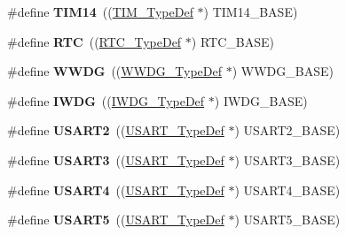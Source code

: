 \begin{DoxyCompactItemize}
\#define {\bfseries T\+I\+M14}~((\hyperlink{struct_t_i_m___type_def}{T\+I\+M\+\_\+\+Type\+Def} $\ast$) T\+I\+M14\+\_\+\+B\+A\+SE)
\item 
\mbox{\label{group___peripheral__declaration_ga5359a088f5d8b20ce74d920e46059304}} 
\#define {\bfseries R\+TC}~((\hyperlink{struct_r_t_c___type_def}{R\+T\+C\+\_\+\+Type\+Def} $\ast$) R\+T\+C\+\_\+\+B\+A\+SE)
\item 
\mbox{\label{group___peripheral__declaration_ga9821fd01757986612ddb8982e2fe27f1}} 
\#define {\bfseries W\+W\+DG}~((\hyperlink{struct_w_w_d_g___type_def}{W\+W\+D\+G\+\_\+\+Type\+Def} $\ast$) W\+W\+D\+G\+\_\+\+B\+A\+SE)
\item 
\mbox{\label{group___peripheral__declaration_gad16b79dd94ee85d261d08a8ee94187e7}} 
\#define {\bfseries I\+W\+DG}~((\hyperlink{struct_i_w_d_g___type_def}{I\+W\+D\+G\+\_\+\+Type\+Def} $\ast$) I\+W\+D\+G\+\_\+\+B\+A\+SE)
\item 
\mbox{\label{group___peripheral__declaration_gaf114a9eab03ca08a6fb720e511595930}} 
\#define {\bfseries U\+S\+A\+R\+T2}~((\hyperlink{struct_u_s_a_r_t___type_def}{U\+S\+A\+R\+T\+\_\+\+Type\+Def} $\ast$) U\+S\+A\+R\+T2\+\_\+\+B\+A\+SE)
\item 
\mbox{\label{group___peripheral__declaration_ga2350115553c1fe0a7bc14e6a7ec6a225}} 
\#define {\bfseries U\+S\+A\+R\+T3}~((\hyperlink{struct_u_s_a_r_t___type_def}{U\+S\+A\+R\+T\+\_\+\+Type\+Def} $\ast$) U\+S\+A\+R\+T3\+\_\+\+B\+A\+SE)
\item 
\mbox{\label{group___peripheral__declaration_ga994759b8667e101cc1346d67833d980c}} 
\#define {\bfseries U\+S\+A\+R\+T4}~((\hyperlink{struct_u_s_a_r_t___type_def}{U\+S\+A\+R\+T\+\_\+\+Type\+Def} $\ast$) U\+S\+A\+R\+T4\+\_\+\+B\+A\+SE)
\item 
\mbox{\label{group___peripheral__declaration_gad50fb4c49d43b2144ee2f8cbdfb9a640}} 
\#define {\bfseries U\+S\+A\+R\+T5}~((\hyperlink{struct_u_s_a_r_t___type_def}{U\+S\+A\+R\+T\+\_\+\+Type\+Def} $\ast$) U\+S\+A\+R\+T5\+\_\+\+B\+A\+SE)
\item 

\end{DoxyCompactItemize}
